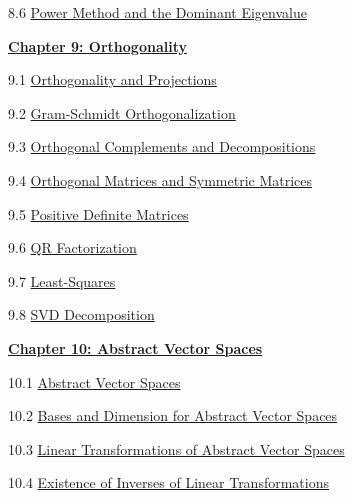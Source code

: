 \documentclass{ximera}
\begin{document}
8.6	\href{https://ximera.osu.edu/linearalgebradzv3/LinearAlgebraInteractiveIntro/EIG-0070/main}{Power Method and the Dominant Eigenvalue}
		
\href{https://ximera.osu.edu/linearalgebradzv3/LinearAlgebraInteractiveIntro/XLAChapter_orthogonality/main}{\textbf{Chapter 9: Orthogonality}}
	
9.1	\href{https://ximera.osu.edu/linearalgebradzv3/LinearAlgebraInteractiveIntro/RTH-0010/main}{Orthogonality and Projections}
	
9.2	\href{https://ximera.osu.edu/linearalgebradzv3/LinearAlgebraInteractiveIntro/RTH-0015/main}{Gram-Schmidt Orthogonalization}
	
9.3	\href{https://ximera.osu.edu/linearalgebradzv3/LinearAlgebraInteractiveIntro/RTH-0020/main}{Orthogonal Complements and Decompositions}
	
9.4	\href{https://ximera.osu.edu/linearalgebradzv3/LinearAlgebraInteractiveIntro/RTH-0035/main}{Orthogonal Matrices and Symmetric Matrices}
	
9.5	\href{https://ximera.osu.edu/linearalgebradzv3/LinearAlgebraInteractiveIntro/RTH-0045/main}{Positive Definite Matrices}
	
9.6	\href{https://ximera.osu.edu/linearalgebradzv3/LinearAlgebraInteractiveIntro/RTH-0040/main}{QR Factorization}
	
9.7	\href{https://ximera.osu.edu/linearalgebradzv3/LinearAlgebraInteractiveIntro/RTH-0030/main}{Least-Squares}
	
9.8	\href{https://ximera.osu.edu/linearalgebradzv3/LinearAlgebraInteractiveIntro/RTH-0060/main}{SVD Decomposition}
		
\href{https://ximera.osu.edu/linearalgebradzv3/LinearAlgebraInteractiveIntro/XLAChapter_vecSpaces/main}{\textbf{Chapter 10: Abstract Vector Spaces}}
	
10.1	\href{https://ximera.osu.edu/linearalgebradzv3/LinearAlgebraInteractiveIntro/VSP-0050/main}{Abstract Vector Spaces}
	
10.2	\href{https://ximera.osu.edu/linearalgebradzv3/LinearAlgebraInteractiveIntro/VSP-0060/main}{Bases and Dimension for Abstract Vector Spaces}
	
10.3	\href{https://ximera.osu.edu/linearalgebradzv3/LinearAlgebraInteractiveIntro/LTR-0022/main}{Linear Transformations of Abstract Vector Spaces}
	
10.4	\href{https://ximera.osu.edu/linearalgebradzv3/LinearAlgebraInteractiveIntro/LTR-0025/main}{Existence of Inverses of Linear Transformations}
	
\end{document}
